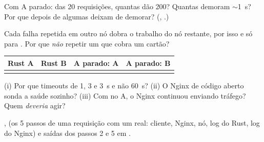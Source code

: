 \begin{prever}
Com A parado: das 20 requisições, quantas dão 200? Quantas demoram $\sim$1~s? Por que depois de algumas deixam de
demorar? (, .)
\end{prever}

\begin{atencao}
Cada falha repetida em outro nó dobra o trabalho do nó restante, por isso  e só para
. Por que \emph{não} repetir um  que cobra um cartão?
\end{atencao}

\begin{center}
\begin{tabularx}{0.8\linewidth}{@{}XXXX@{}}
\toprule
\textbf{Rust A} & \textbf{Rust B} & \textbf{A parado: A} & \textbf{A parado: B}\\ \midrule
\rule{0pt}{1.8em} & & & \\ \bottomrule
\end{tabularx}
\end{center}

\begin{checagem}
(i) Por que timeouts de 1, 3 e 3~s e não 60~s? (ii) O Nginx de código aberto sonda a saúde sozinho? (iii) Com
 no A, o Nginx continuou enviando tráfego? Quem \emph{deveria} agir?
\end{checagem}

\begin{evid}[Entrega C]
,  (os 5 passos de uma requisição com um 
real: cliente, Nginx, nó, log do Rust, log do Nginx) e saídas dos passos 2 e 5 em .
\end{evid}
